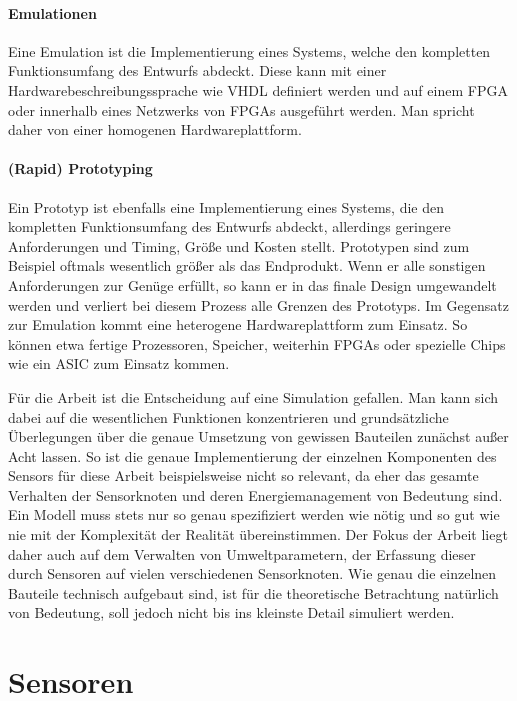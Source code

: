 \paragraph{Emulationen}

Eine Emulation ist die Implementierung eines Systems, welche den kompletten Funktionsumfang des Entwurfs abdeckt. Diese kann mit einer Hardwarebeschreibungssprache wie VHDL definiert werden und auf einem FPGA oder innerhalb eines Netzwerks von FPGAs ausgeführt werden. Man spricht daher von einer homogenen Hardwareplattform.

\paragraph{(Rapid) Prototyping}

Ein Prototyp ist ebenfalls eine Implementierung eines Systems, die den kompletten Funktionsumfang des Entwurfs abdeckt, allerdings geringere Anforderungen und Timing, Größe und Kosten stellt. Prototypen sind zum Beispiel oftmals wesentlich größer als das Endprodukt. Wenn er alle sonstigen Anforderungen zur Genüge erfüllt, so kann er in das finale Design umgewandelt werden und verliert bei diesem Prozess alle Grenzen des Prototyps. Im Gegensatz zur Emulation kommt eine heterogene Hardwareplattform zum Einsatz. So können etwa fertige Prozessoren, Speicher, weiterhin FPGAs oder spezielle Chips wie ein ASIC zum Einsatz kommen.

\endgraf

Für die Arbeit ist die Entscheidung auf eine Simulation gefallen. Man kann sich dabei auf die wesentlichen Funktionen konzentrieren und grundsätzliche Überlegungen über die genaue Umsetzung von gewissen Bauteilen zunächst außer Acht lassen. So ist die genaue Implementierung der einzelnen Komponenten des Sensors für diese Arbeit beispielsweise nicht so relevant, da eher das gesamte Verhalten der Sensorknoten und deren Energiemanagement von Bedeutung sind. Ein Modell muss stets nur so genau spezifiziert werden wie nötig und so gut wie nie mit der Komplexität der Realität übereinstimmen. \newline
Der Fokus der Arbeit liegt daher auch auf dem Verwalten von Umweltparametern, der Erfassung dieser durch Sensoren auf vielen verschiedenen Sensorknoten. Wie genau die einzelnen Bauteile technisch aufgebaut sind, ist für die theoretische Betrachtung natürlich von Bedeutung, soll jedoch nicht bis ins kleinste Detail simuliert werden.
\newpage
\section{Sensoren}

